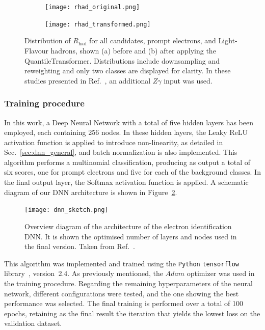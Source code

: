 \begin{figure}[htbp]
  \centering
  \begin{subfigure}[b]{0.49\textwidth}
      \texttt{[image: rhad\_original.png]}
      \caption{}
  \end{subfigure}
  \hfill
  \begin{subfigure}[b]{0.49\textwidth}
      \texttt{[image: rhad\_transformed.png]}
      \caption{}
  \end{subfigure}
  \hfill
  \caption{Distribution of $R_{\text{had}}$ for all candidates, prompt electrons, and Light-Flavour hadrons, shown (a) before and (b) after applying the QuantileTransformer. Distributions include downsampling and reweighting and only two classes are displayed for clarity. In these studies presented in Ref.~\cite{dnn_paper}, an additional $Z\gamma$ input was used.}
  \label{fig:transformed}
\end{figure}

\subsubsection{Training procedure}

In this work, a Deep Neural Network with a total of five hidden layers has been employed, each containing 256 nodes. In these hidden layers, the Leaky ReLU activation function is applied to introduce non-linearity, as detailed in Sec.~\ref{sec:dnn_general}, and batch normalization is also implemented.  
This algorithm performs a multinomial classification, producing as output a total of six scores, one for prompt electrons and five for each of the background classes. In the final output layer, the Softmax activation function is applied.  
A schematic diagram of our DNN architecture is shown in Figure~\ref{dnn_sketch}.

\begin{figure}[htbp]
  \centering
  \texttt{[image: dnn\_sketch.png]}
  \caption{Overview diagram of the architecture of the electron identification DNN. It is shown the optimised number of layers and nodes used in the final version. Taken from Ref.~\cite{dnn_paper}.}
  \label{dnn_sketch}
\end{figure}

This algorithm was implemented and trained using the \texttt{Python} \texttt{tensorflow} library~\cite{tensorflow2015}, version~2.4. As previously mentioned, the $Adam$ optimizer was used in the training procedure. Regarding the remaining hyperparameters of the neural network, different configurations were tested, and the one showing the best performance was selected.  
The final training is performed over a total of 100 epochs, retaining as the final result the iteration that yields the lowest loss on the validation dataset.

